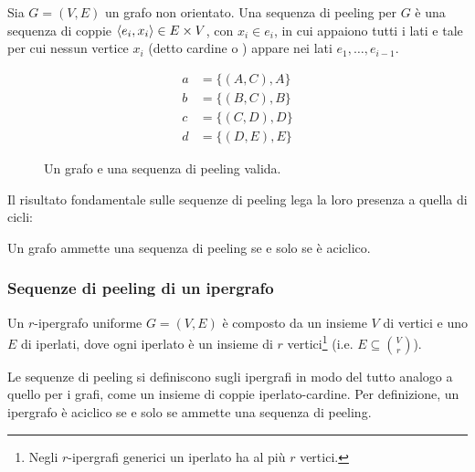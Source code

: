 \begin{defin}
	Sia $G=(V,E)$ un grafo non orientato. Una sequenza di peeling per $G$ è una sequenza di coppie $\langle e_i,x_i \rangle\in E\times V$, con $x_i\in e_i$, in cui appaiono tutti i lati e tale per cui nessun vertice $x_i$ (detto cardine o ) appare nei lati $e_1,\dots,e_{i-1}$.
\end{defin}

\begin{figure}[ht]
	\begin{center}
		\begin{subfigure}[b]{0.45\textwidth}
			\begin{center}
				
			\end{center}
		\end{subfigure}
		\begin{subfigure}[b]{0.45\textwidth}
			\begin{center}
				\begin{align*}
					a & = \{(A, C), A\} \\
					b & = \{(B, C), B\} \\
					c & = \{(C, D), D\} \\
					d & = \{(D, E), E\}
				\end{align*}
			\end{center}
		\end{subfigure}
	\end{center}
	\caption{Un grafo e una sequenza di peeling valida.}%
	\label{fig:example_peeling}
\end{figure}

Il risultato fondamentale sulle sequenze di peeling lega la loro presenza a quella di cicli:
\begin{theorem}
	Un grafo ammette una sequenza di peeling se e solo se è aciclico.
\end{theorem}

\subsubsection{Sequenze di peeling di un ipergrafo}
Un $r$-ipergrafo uniforme $G=(V,E)$ è composto da un insieme $V$ di vertici e uno $E$ di iperlati, dove ogni iperlato è un insieme di $r$ vertici\footnote{Negli $r$-ipergrafi generici un iperlato ha al più $r$ vertici.} (i.e. $E\subseteq\binom{V}{r}$).

Le sequenze di peeling si definiscono sugli ipergrafi in modo del tutto analogo a quello per i grafi, come un insieme di coppie iperlato-cardine. Per definizione, un ipergrafo è aciclico se e solo se ammette una sequenza di peeling.



